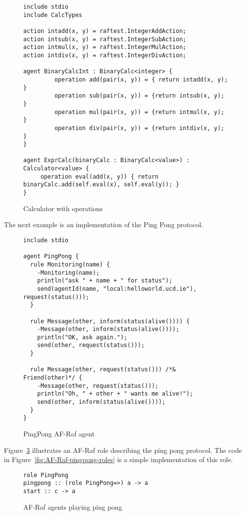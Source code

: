 \documentclass[a4paper,12pt,oneside,fleqn]{book} %
\theoremstyle{plain}
\theoremstyle{definition}
\theoremstyle{remark}
\begin{document}
\begin{figure}\footnotesize %
\begin{verbatim}
include stdio
include CalcTypes

action intadd(x, y) = raftest.IntegerAddAction;
action intsub(x, y) = raftest.IntegerSubAction;
action intmul(x, y) = raftest.IntegerMulAction;
action intdiv(x, y) = raftest.IntegerDivAction;

agent BinaryCalcInt : BinaryCalc<integer> {
         operation add(pair(x, y)) = { return intadd(x, y); }
         operation sub(pair(x, y)) = {return intsub(x, y); }
         operation mul(pair(x, y)) = {return intmul(x, y); }
         operation div(pair(x, y)) = {return intdiv(x, y); }
}

agent ExprCalc(binaryCalc : BinaryCalc<value>) : Calculator<value> {
     operation eval(add(x, y)) { return binaryCalc.add(self.eval(x), self.eval(y)); }
}
\end{verbatim}
\caption{Calculator with operations}
\label{fig:calc-op}
\end{figure} %

The next example is an implementation of the Ping Pong protocol. 

\begin{figure}\footnotesize %
\begin{verbatim}
include stdio

agent PingPong {
  rule Monitoring(name) {
    -Monitoring(name);
    println("ask " + name + " for status");
    send(agentId(name, "local:helloworld.ucd.ie"), request(status()));
  }
       
  rule Message(other, inform(status(alive()))) {
    -Message(other, inform(status(alive())));
    println("OK, ask again.");
    send(other, request(status())); 
  }
            
  rule Message(other, request(status())) /*& Friend(other)*/ {
    -Message(other, request(status()));
    println("Oh, " + other + " wants me alive!");
    send(other, inform(status(alive())));
  }
}
\end{verbatim}
\caption{PingPong AF-Raf agent}
\label{fig:AF-Raf-pingpong-d}
\end{figure} %


Figure~\ref{fig:AF-Raf-pingpong-role} illustrates an AF-Raf role describing
the ping pong protocol. The code in Figure~\ref{fig:AF-Raf-pingpong-roles}
is a simple implementation of this role.

\begin{figure}\footnotesize %
\begin{verbatim}
role PingPong
pingpong :: (role PingPong=>) a -> a
start :: c -> a
\end{verbatim}
\caption{AF-Raf agents playing ping pong}
\label{fig:AF-Raf-pingpong-role}
\end{figure} %
\end{document}
